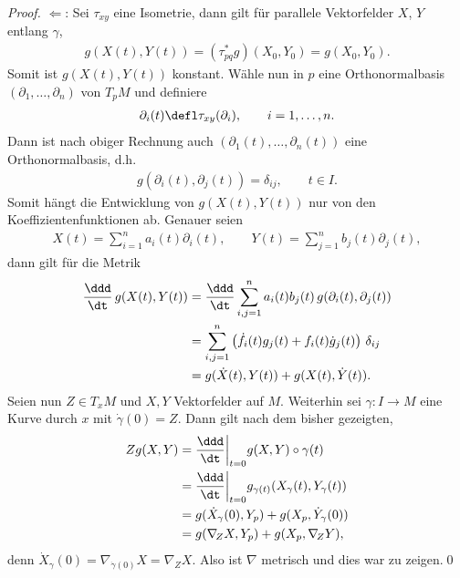 \documentclass[%
	paper=a5,%
	fleqn,%
	DIV=18,%
	BCOR=0mm,
	fontsize=11pt,
	titlepage=false,%
	bibliography=totoc,
	DIV=18,%
	twoside=true,
	pdftitle=Riemannsche Geometrie,
	pdfauthor=Uwe Semmelmann,
	numbers=noendperiod]%
	{scrbook}
\begin{document}
\begin{proof}
$\Leftarrow$: Sei $\tau_{xy}$ eine Isometrie, dann gilt für parallele
Vektorfelder $X$, $Y$ entlang $\gamma$,
\begin{align*}
g(X(t),Y(t)) = (\tau_{pq}^*g)(X_0,Y_0) = g(X_0,Y_0).
\end{align*}
Somit ist $g(X(t),Y(t))$ konstant. Wähle nun in $p$ eine Orthonormalbasis
$(\partial_1,\ldots,\partial_n)$ von $T_pM$ und definiere
\begin{align*}
\partial_i(t) \defl \tau_{xy}(\partial_i),\qquad i=1,\ldots,n.
\end{align*}
Dann ist nach obiger Rechnung auch $(\partial_1(t),\ldots,\partial_n(t))$
eine Orthonormalbasis, d.h.
\begin{align*}
g(\partial_i(t),\partial_j(t)) = \delta_{ij},\qquad t\in I.
\end{align*}
Somit hängt die Entwicklung von $g(X(t),Y(t))$ nur von den
Koeffizientenfunktionen ab. Genauer seien
\begin{align*}
X(t) = \sum_{i=1}^n a_i(t) \partial_i(t),\qquad
Y(t) = \sum_{j=1}^n b_j(t) \partial_j(t),
\end{align*}
dann gilt für die Metrik
\begin{align*}
\frac{\ddd}{\dt}\, g(X(t),Y(t)) &= 
 \frac{\ddd}{\dt} \sum_{i,j=1}^n a_i(t) b_j(t)\,
 g(\partial_i(t),\partial_j(t))\\ 
 &= \sum_{i,j=1}^n \left(\dot{f}_i(t)g_j(t) + f_i(t)\dot
 g_j(t)\right)\,\delta_{ij}\\ 
 &= g(\dot{X}(t),Y(t)) + g(X(t),\dot Y(t)).
\end{align*}
Seien nun $Z\in T_xM$ und $X,Y$ Vektorfelder auf $M$. Weiterhin sei $\gamma
: I\to M$ eine Kurve durch $x$ mit $\dot{\gamma}(0) = Z$. Dann gilt nach dem
bisher gezeigten,
\begin{align*}
Z g(X,Y) &= \frac{\ddd}{\dt}\bigg|_{t=0} g(X,Y)\circ \gamma(t)\\
&= \frac{\ddd}{\dt}\bigg|_{t=0} g_{\gamma(t)}(X_\gamma(t),
Y_\gamma(t))\\
&= g(\dot{X}_\gamma(0),Y_p) + 
g(X_p,\dot{Y}_\gamma(0))\\
&= g(\nabla_{\!Z} X,Y_p) + 
g(X_p,\nabla_{\!Z} Y),
\end{align*}
denn $\dot{X}_\gamma(0) = \nabla_{\dot{\gamma}(0)}X = \nabla_Z X$. Also ist
$\nabla$ metrisch und dies war zu zeigen.\qed
\end{proof}
\end{document}
